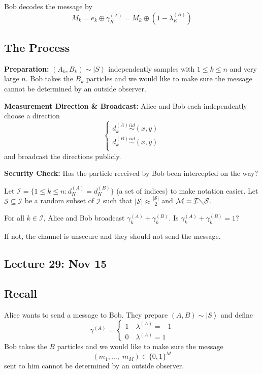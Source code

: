 \documentclass[12pt]{article}
\newcommand{\ket}[1]{\left\vert #1 \right\rangle}
\newcommand{\abs}[1]{\left\vert #1 \right\vert}
\begin{document}
        Bob decodes the message by 
        \[M_k = e_k \oplus \gamma_K^{(A)} = M_k \oplus (1 - \lambda_K^{(B)})\]

    \subsection*{The Process}
        \textbf{Preparation:} $(A_k, B_k) \sim \ket{S}$ independently samples with $1 \leq k \leq n$ and very large $n$. Bob takes the $B_k$ particles and we would like to make sure the message cannot be determined by an outside observer. 

        \textbf{Measurement Direction \& Broadcast:} Alice and Bob each independently choose a direction 
        \[\begin{cases}
            d_k^{(A)} \overset{iid}{\sim} (x, y)\\
            d_k^{(B)} \overset{iid}{\sim} (x, y)\\
        \end{cases}\]
        and broadcast the directions publicly. 

        \textbf{Security Check:} Has the particle received by Bob been intercepted on the way? 
        
        Let $\mathcal{I} = \{1 \leq k \leq n : d_K^{(A)} = d_K^{(B)}\}$ (a set of indices) to make notation easier. Let $\mathcal{S} \subseteq \mathcal{I}$ be a random subset of $\mathcal{I}$ such that $\abs{\mathcal{S}} \approx \frac{\abs{\mathcal{S}}}{2}$ and $\mathcal{M} = \mathcal{I} \diagdown \mathcal{S}$. 

        For all $k \in \mathcal{I}$, Alice and Bob broadcast $\gamma_k^{(A)} + \gamma_{k}^{(B)}$. Is $\gamma_k^{(A)} + \gamma_{k}^{(B)} = 1$?  

        If not, the channel is unsecure and they should not send the message. 

\subsection*{Lecture 29: Nov 15}
    \subsection*{Recall}
        Alice wants to send a message to Bob. They prepare $(A, B) \sim \ket{S}$ and define 
        \[\gamma^{(A)} = \begin{cases}
            1 \quad \lambda^{(A)} = -1\\
            0 \quad \lambda^{(A)} = 1
        \end{cases}\]
        Bob takes the $B$ particles and we would like to make sure the message 
        \[(m_1, \dots,\; m_M) \in \{0, 1\}^M\]
        sent to him cannot be determined by an outside observer. 
\end{document}
